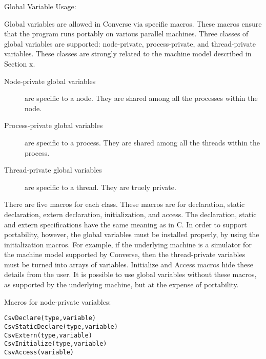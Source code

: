 %
%
%
%
%

Global Variable Usage:

Global variables are allowed in Converse via specific macros.  These macros 
ensure that the program runs portably on various parallel machines. 
Three classes of global variables are supported: node-private,
process-private, and thread-private variables. These classes are
strongly related to the machine model described in Section x.

\begin{description}
\item[Node-private global variables] are specific to a node. They are
     shared among all the processes within the node.
\item[Process-private global variables]  are specific to a process. They are
     shared among all the threads within the process.
\item[Thread-private global variables] are specific to a thread. They are 
     truely private.
\end{description}

There are five macros for each class. These macros are for
declaration, static declaration, extern declaration, initialization, and
access. The declaration, static and extern specifications have the same
meaning as in C. In order to support portability, however, the global
variables must be installed properly, by using the initialization macros.
For example, if the underlying machine is a simulator for the machine model 
supported by Converse, then the thread-private variables must be turned into 
arrays of variables.  Initialize and Access macros hide these details from 
the user.  It is possible to use global variables without these macros, 
as supported by the underlying machine, but at the expense of portability.


Macros for node-private variables:
\begin{verbatim}
CsvDeclare(type,variable)
CsvStaticDeclare(type,variable)
CsvExtern(type,variable)
CsvInitialize(type,variable)
CsvAccess(variable)
\end{verbatim}


